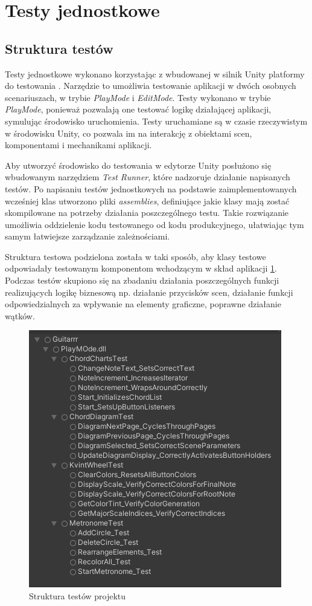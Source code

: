 \section{Testy jednostkowe}

\subsection{Struktura testów}

Testy jednostkowe wykonano korzystając z wbudowanej w silnik Unity platformy do testowania \cite{UnityTestFramework}. Narzędzie to umożliwia testowanie aplikacji w dwóch osobnych scenariuszach, w trybie \emph{PlayMode} i \emph{EditMode}. Testy wykonano w trybie \emph{PlayMode}, ponieważ pozwalają one testować logikę działającej aplikacji, symulując środowisko uruchomienia. Testy uruchamiane są w czasie rzeczywistym w środowisku Unity, co pozwala im na interakcję z obiektami scen, komponentami i mechanikami aplikacji.

Aby utworzyć środowisko do testowania w edytorze Unity posłużono się wbudowanym narzędziem \emph{Test Runner}, które nadzoruje działanie napisanych testów. Po napisaniu testów jednostkowych na podstawie zaimplementowanych wcześniej klas utworzono pliki \emph{assemblies}, definiujące jakie klasy mają zostać skompilowane na potrzeby działania poszczególnego testu. Takie rozwiązanie umożliwia oddzielenie kodu testowanego od kodu produkcyjnego, ułatwiając tym samym łatwiejsze zarządzanie zależnościami. 

Struktura testowa podzielona została w taki sposób, aby klasy testowe odpowiadały testowanym komponentom wchodzącym w skład aplikacji \ref{fig:strukturaTestów}. Podczas testów skupiono się na zbadaniu działania poszczególnych funkcji realizujących logikę biznesową np. działanie przycisków scen, działanie funkcji odpowiedzialnych za wpływanie na elementy graficzne, poprawne działanie wątków.

\begin{figure}[htb]
    \centering
    \includegraphics[scale=1]{rys05/Testy}
   \caption{Struktura testów projektu}
   \label{fig:strukturaTestów}
\end{figure}

